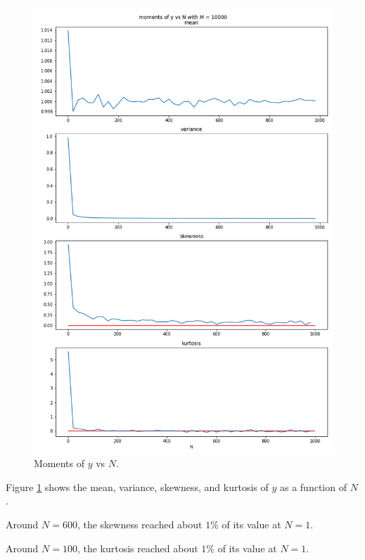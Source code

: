 \documentclass[11pt]{article}
\begin{document}
\begin{figure}[H]
    \centering
    \includegraphics[scale = 0.55]{images/ps-3-4_moments.png}
    \caption{Moments of $y$ vs $N$.}
    \label{moments}
\end{figure}

Figure \ref{moments} shows the mean, variance, skewness, and kurtosis of $y$ as a function of $N$.

Around $N = 600$, the skewness reached about $1\%$ of its value at $N = 1$.

Around $N = 100$, the kurtosis reached about $1\%$ of its value at $N = 1$.
\end{document}
